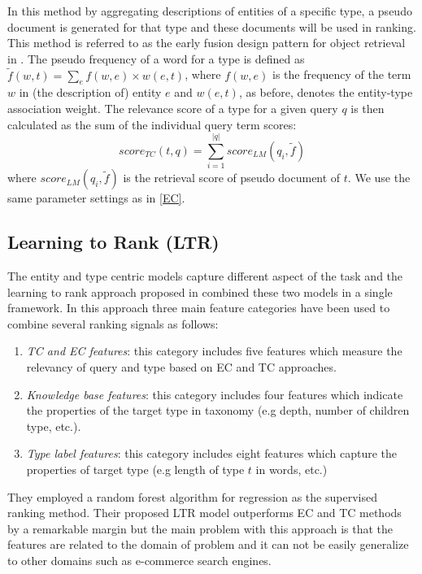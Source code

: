 In this method by aggregating descriptions of entities of a specific type, a pseudo document is generated for that type and these documents will be used in ranking. This method is referred to as the early fusion design pattern for object retrieval in \cite{zhang2017design}. The pseudo frequency of a word for a type is defined as 
$\tilde{f}(w,t) = \sum_{e}{f(w,e)\times w(e,t)}$, where $f(w,e)$ is the frequency of the term $w$ in (the description of) entity $e$ and $w(e,t)$, as before, denotes the entity-type association weight. The relevance score of a type for a given query $q$ is then calculated as the sum of the individual query term scores:
\begin{equation}
score_{TC}(t,q) = \sum_{i=1}^{|q|}{score_{LM}(q_i,\tilde{f})}
\end{equation}
where $score_{LM}(q_i,\tilde{f})$ is the retrieval score of pseudo document of $t$. We use the same parameter settings as in \ref{EC}.

\subsection{Learning to Rank (LTR)}
The entity and type centric models capture different aspect of the task and the learning to rank approach proposed in \cite{Garigliotti:2017:TTI:3077136.3080659} combined these two models in a single framework. In this approach three main feature categories have been used to combine several ranking signals as follows:
\begin{enumerate}
	\item \textit{TC and EC features}: this category includes five features which measure the relevancy of query and type based on EC and TC approaches.
	\item \textit{Knowledge base features}: this category includes four features which indicate the properties of the target type in taxonomy (e.g depth, number of children type, etc.).
	\item \textit{Type label features}: this category includes eight features which capture the properties of target type (e.g length of type $t$ in words, etc.)
\end{enumerate}
They employed a random forest algorithm for regression as the supervised ranking method. Their proposed LTR model outperforms EC and TC methods by a remarkable margin but the main problem with this approach is that the features are related to the domain of problem and it can not be easily generalize to other domains such as e-commerce search engines.
